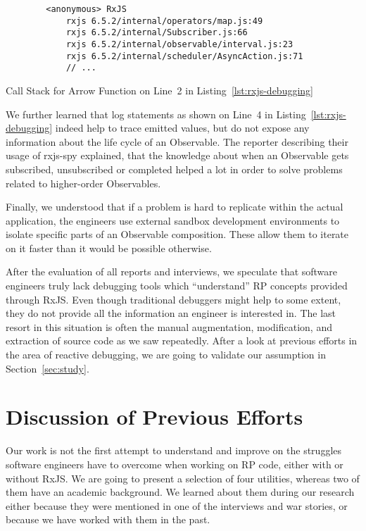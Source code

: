 \documentclass[12pt,a4paper]{article}
\begin{document}
\begin{listing}[H]
	\begin{verbatim}
		<anonymous> RxJS
			rxjs 6.5.2/internal/operators/map.js:49
			rxjs 6.5.2/internal/Subscriber.js:66
			rxjs 6.5.2/internal/observable/interval.js:23
			rxjs 6.5.2/internal/scheduler/AsyncAction.js:71
			// ...
	\end{verbatim}
	\caption{Call Stack for Arrow Function on Line~2 in Listing~\ref{lst:rxjs-debugging}}
	\label{lst:rxjs-call-stack}
\end{listing}

We further learned that log statements as shown on Line~4 in Listing~\ref{lst:rxjs-debugging} indeed help to trace emitted values, but do not expose any information about the life cycle of an Observable. The reporter describing their usage of rxjs-spy explained, that the knowledge about when an Observable gets subscribed, unsubscribed or completed helped a lot in order to solve problems related to higher-order Observables.

Finally, we understood that if a problem is hard to replicate within the actual application, the engineers use external sandbox development environments to isolate specific parts of an Observable composition. These allow them to iterate on it faster than it would be possible otherwise.

After the evaluation of all reports and interviews, we speculate that software engineers truly lack debugging tools which ``understand'' RP concepts provided through RxJS. Even though traditional debuggers might help to some extent, they do not provide all the information an engineer is interested in. The last resort in this situation is often the manual augmentation, modification, and extraction of source code as we saw repeatedly. After a look at previous efforts in the area of reactive debugging, we are going to validate our assumption in Section~\ref{sec:study}.


\section{Discussion of Previous Efforts}
\label{sec:discussion}

Our work is not the first attempt to understand and improve on the struggles software engineers have to overcome when working on RP code, either with or without RxJS. We are going to present a selection of four utilities, whereas two of them have an academic background. We learned about them during our research either because they were mentioned in one of the interviews and war stories, or because we have worked with them in the past.
\end{document}
